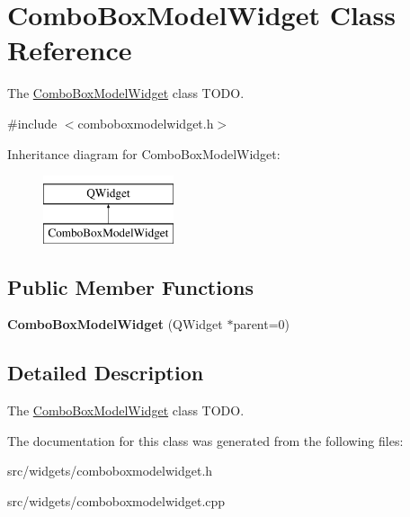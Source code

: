\hypertarget{classComboBoxModelWidget}{\section{Combo\+Box\+Model\+Widget Class Reference}
\label{classComboBoxModelWidget}
}


The \hyperlink{classComboBoxModelWidget}{Combo\+Box\+Model\+Widget} class T\+O\+D\+O.  




{\ttfamily \#include $<$comboboxmodelwidget.\+h$>$}

Inheritance diagram for Combo\+Box\+Model\+Widget\+:\begin{figure}[H]
\begin{center}
\leavevmode
\includegraphics[height=2.000000cm]{d5/d79/classComboBoxModelWidget}
\end{center}
\end{figure}
\subsection*{Public Member Functions}
\begin{DoxyCompactItemize}
\item 
\hypertarget{classComboBoxModelWidget_a8632edda11e66ee50cfc89729b2feb3a}{{\bfseries Combo\+Box\+Model\+Widget} (Q\+Widget $\ast$parent=0)}\label{classComboBoxModelWidget_a8632edda11e66ee50cfc89729b2feb3a}

\end{DoxyCompactItemize}


\subsection{Detailed Description}
The \hyperlink{classComboBoxModelWidget}{Combo\+Box\+Model\+Widget} class T\+O\+D\+O. 

The documentation for this class was generated from the following files\+:\begin{DoxyCompactItemize}
\item 
src/widgets/comboboxmodelwidget.\+h\item 
src/widgets/comboboxmodelwidget.\+cpp\end{DoxyCompactItemize}
